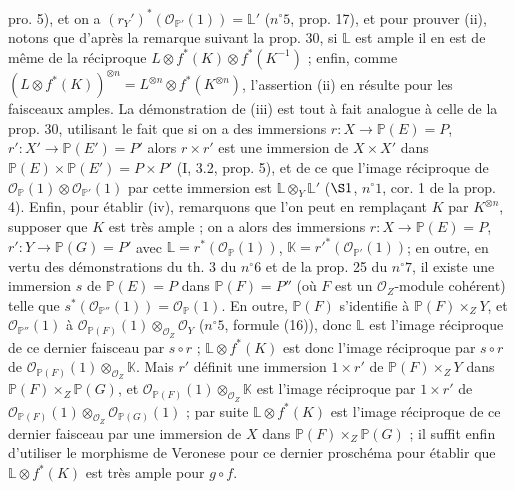pro. 5), et on a $(r_Y')^* (\mathcal{O}_{\mathbb{P}'}(1)) = \mathbb{L}'$ ($n^\circ 5$, prop. 17), et pour prouver (ii), notons que d'après la remarque suivant la prop. 30, si $\mathbb{L}$ est ample il en est de même de la réciproque $L \otimes f^* (K) \otimes f^* (K^{-1})$ ; enfin, comme $(L \otimes f^* (K))^{\otimes n} = L^{\otimes n} \otimes f^* (K^{\otimes n})$, l'assertion (ii) en résulte pour les faisceaux amples. La démonstration de (iii) est tout à fait analogue à celle de la prop. 30, utilisant le fait que si on a des immersions $r : X \to \mathbb{P}(E) = P$, $r' : X' \to \mathbb{P}(E') = P'$ alors $r \times r'$ est une immersion de $X \times X'$ dans $\mathbb{P}(E) \times \mathbb{P}(E') = P \times P'$ (I, 3.2, prop. 5), et de ce que l'image réciproque de $\mathcal{O}_{\mathbb{P}}(1) \otimes \mathcal{O}_{\mathbb{P}'}(1)$ par cette immersion est $\mathbb{L} \otimes_Y \mathbb{L}'$ ($\S 1$, $n^\circ 1$, cor. 1 de la prop. 4). Enfin, pour établir (iv), remarquons que l'on peut en remplaçant $K$ par $K^{\otimes n}$, supposer que $K$ est très ample ; on a alors des immersions $r : X \to \mathbb{P}(E) = P$, $r' : Y \to \mathbb{P}(G) = P'$ avec $\mathbb{L} = r^* (\mathcal{O}_{\mathbb{P}}(1))$, $\mathbb{K} = r'^* (\mathcal{O}_{\mathbb{P}'}(1))$; en outre, en vertu des démonstrations du th. 3 du $n^\circ 6$ et de la prop. 25 du $n^\circ 7$, il existe une immersion $s$ de $\mathbb{P}(E) = P$ dans $\mathbb{P}(F) = P''$ (où $F$ est un $\mathcal{O}_Z$-module cohérent) telle que $s^* (\mathcal{O}_{\mathbb{P}''}(1)) = \mathcal{O}_{\mathbb{P}}(1)$. En outre, $\mathbb{P}(F)$ s'identifie à $\mathbb{P}(F) \times_Z Y$, et $\mathcal{O}_{\mathbb{P}''}(1)$ à $\mathcal{O}_{\mathbb{P}(F)}(1) \otimes_{\mathcal{O}_Z} \mathcal{O}_Y$ ($n^\circ 5$, formule (16)), donc $\mathbb{L}$ est l'image réciproque de ce dernier faisceau par $s \circ r$ ; $\mathbb{L} \otimes f^* (K)$ est donc l'image réciproque par $s \circ r$ de $\mathcal{O}_{\mathbb{P}(F)}(1) \otimes_{\mathcal{O}_Z} \mathbb{K}$. Mais $r'$ définit une immersion $1 \times r'$ de $\mathbb{P}(F) \times_Z Y$ dans $\mathbb{P}(F) \times_Z \mathbb{P}(G)$, et $\mathcal{O}_{\mathbb{P}(F)}(1) \otimes_{\mathcal{O}_Z} \mathbb{K}$ est l'image réciproque par $1 \times r'$ de $\mathcal{O}_{\mathbb{P}(F)}(1) \otimes_{\mathcal{O}_Z} \mathcal{O}_{\mathbb{P}(G)}(1)$ ; par suite $\mathbb{L} \otimes f^* (K)$ est l'image réciproque de ce dernier faisceau par une immersion de $X$ dans $\mathbb{P}(F) \times_Z \mathbb{P}(G)$ ; il suffit enfin d'utiliser le morphisme de Veronese pour ce dernier proschéma pour établir que $\mathbb{L} \otimes f^* (K)$ est très ample pour $g \circ f$.

